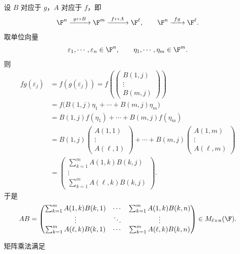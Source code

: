 \begin{definition}[矩阵的乘法]
	设 $B$ 对应于 $g$，$A$ 对应于 $f$，即
	\[
	\F^n\xrightarrow{\ g\leftrightarrow B\ }\F^m
	\xrightarrow{\ f\leftrightarrow A\ }\F^\ell,
	\qquad
	\F^n\xrightarrow{\ fg\ }\F^\ell.
	\]
	取单位向量
	\[
	\varepsilon_1,\cdots,\varepsilon_n\in\F^n,
	\qquad
	\eta_1,\cdots,\eta_m\in\F^m.
	\]
	则
	\[
	\begin{aligned}
		fg(\varepsilon_j)
		&=f(g(\varepsilon_j))
		=f\left(
		\begin{pmatrix}
			B(1,j)\\ \vdots\\ B(m,j)
		\end{pmatrix}
		\right)\\
		&=f\bigl(B(1,j)\eta_1+\cdots+B(m,j)\eta_m\bigr)\\
		&=B(1,j)f(\eta_1)+\cdots+B(m,j)f(\eta_m)\\
		&=B(1,j)
		\begin{pmatrix}
			A(1,1)\\ \vdots\\ A(\ell,1)
		\end{pmatrix}
		+\cdots+
		B(m,j)
		\begin{pmatrix}
			A(1,m)\\ \vdots\\ A(\ell,m)
		\end{pmatrix}\\
		&=
		\begin{pmatrix}
			\sum_{k=1}^{m}A(1,k)B(k,j)\\
			\vdots\\
			\sum_{k=1}^{m}A(\ell,k)B(k,j)
		\end{pmatrix}.
	\end{aligned}
	\]
	于是
	\[
	AB=
	\begin{pmatrix}
		\sum_{k=1}^{m}A(1,k)B(k,1)&\cdots&\sum_{k=1}^{m}A(1,k)B(k,n)\\
		\vdots&\ddots&\vdots\\
		\sum_{k=1}^{m}A(\ell,k)B(k,1)&\cdots&\sum_{k=1}^{m}A(\ell,k)B(k,n)
	\end{pmatrix}
	\in M_{\ell\times n}(\F).
	\]

\end{definition}
	矩阵乘法满足
